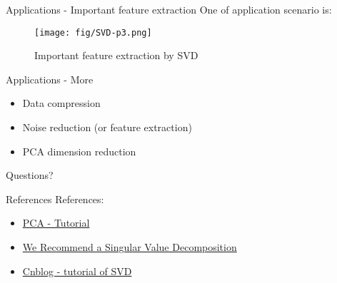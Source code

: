 \documentclass[10pt]{beamer}
\begin{document}
\begin{frame}{Applications - Important feature extraction}
  One of application scenario is:
  \begin{figure}[htbp]
    \centering
    \texttt{[image: fig/SVD-p3.png]}
    \caption{Important feature extraction by SVD}
  \end{figure}
\end{frame}

\begin{frame}{Applications - More}
  \begin{itemize}
    \item Data compression
    \item Noise reduction (or feature extraction)
    \item PCA dimension reduction
  \end{itemize}
\end{frame}

\begin{frame}[standout]
  Questions?
\end{frame}

\begin{frame}{References}
  References:
  \begin{itemize}
    \item \href{http://blog.codinglabs.org/articles/pca-tutorial.html}{PCA - Tutorial}
    \item \href{http://www.ams.org/publicoutreach/feature-column/fcarc-svd}{We Recommend a Singular Value Decomposition}
    \item \href{https://www.cnblogs.com/pinard/p/6251584.html}{Cnblog - tutorial of SVD}
  \end{itemize}
\end{frame}
\end{document}
